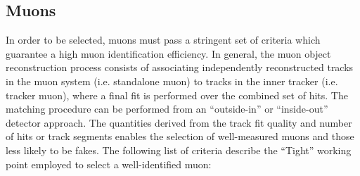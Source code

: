 \subsection{Muons} 
\label{subsec:muon}
In order to be selected, muons must pass a stringent set of criteria which guarantee a high muon identification efficiency. In general, the muon object reconstruction process consists of associating independently reconstructed tracks in the muon system (i.e. standalone muon) to tracks in the inner tracker (i.e. tracker muon), where a final fit is performed over the combined set of hits. The matching procedure can be performed from an ``outside-in'' or ``inside-out'' detector approach. The quantities derived from the track fit quality and number of hits or track segments enables the selection of well-measured muons and those less likely to be fakes. The following list of criteria describe the ``Tight'' working point employed to select a well-identified muon:


